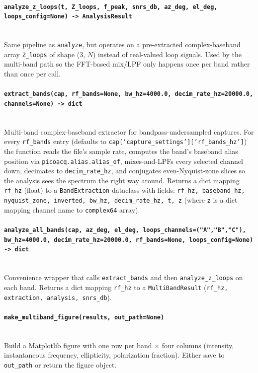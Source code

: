 \documentclass[11pt]{article}
\begin{document}
\paragraph{\texttt{analyze\_z\_loops(t, Z\_loops, f\_peak, snrs\_db, az\_deg, el\_deg, loops\_config=None) -> AnalysisResult}}\quad\\
Same pipeline as \texttt{analyze}, but operates on a pre-extracted
complex-baseband array \texttt{Z\_loops} of shape (3, $N$) instead of
real-valued loop signals.  Used by the multi-band path so the FFT-based
mix/LPF only happens once per band rather than once per call.

\paragraph{\texttt{extract\_bands(cap, rf\_bands=None, bw\_hz=4000.0, decim\_rate\_hz=20000.0, channels=None) -> dict}}\quad\\
Multi-band complex-baseband extractor for bandpass-undersampled
captures.  For every \texttt{rf\_bands} entry (defaults to
\texttt{cap['capture\_settings']['rf\_bands\_hz']}) the function reads
the file's sample rate, computes the band's baseband alias position
via \texttt{picoacq.alias.alias\_of}, mixes-and-LPFs every selected
channel down, decimates to \texttt{decim\_rate\_hz}, and conjugates
even-Nyquist-zone slices so the analysis sees the spectrum the right
way around.  Returns a dict mapping \texttt{rf\_hz} (float) to a
\texttt{BandExtraction} dataclass with fields:
\texttt{rf\_hz, baseband\_hz, nyquist\_zone, inverted, bw\_hz,
decim\_rate\_hz, t, z} (where \texttt{z} is a dict mapping
channel name to \texttt{complex64} array).

\paragraph{\texttt{analyze\_all\_bands(cap, az\_deg, el\_deg, loops\_channels=("A","B","C"), bw\_hz=4000.0, decim\_rate\_hz=20000.0, rf\_bands=None, loops\_config=None) -> dict}}\quad\\
Convenience wrapper that calls \texttt{extract\_bands} and then
\texttt{analyze\_z\_loops} on each band.  Returns a dict mapping
\texttt{rf\_hz} to a \texttt{MultiBandResult}
(\texttt{rf\_hz, extraction, analysis, snrs\_db}).

\paragraph{\texttt{make\_multiband\_figure(results, out\_path=None)}}\quad\\
Build a Matplotlib figure with one row per band $\times$ four columns
(intensity, instantaneous frequency, ellipticity, polarization
fraction).  Either save to \texttt{out\_path} or return the figure
object.
\end{document}
